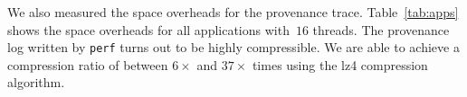


 We also measured the space overheads for the provenance trace. Table~\ref{tab:apps} shows the space overheads for all applications with~$16$ threads. The provenance log written by {\tt perf} turns out to be highly compressible. We
are able to achieve a compression ratio of between $6\times$ and $37\times$ times using the lz4 compression algorithm.

